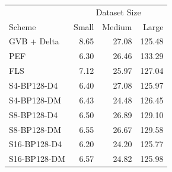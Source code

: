 \begin{tabular}{lrrr}
\toprule
 & \multicolumn{3}{c}{Dataset Size} \\
Scheme & Small & Medium & Large \\
\midrule
GVB + Delta & 8.65 & 27.08 & 125.48 \\
PEF & 6.30 & 26.46 & 133.29 \\
FLS & 7.12 & 25.97 & 127.04 \\
S4-BP128-D4 & 6.40 & 27.08 & 125.97 \\
S4-BP128-DM & 6.43 & 24.48 & 126.45 \\
S8-BP128-D4 & 6.50 & 26.89 & 129.10 \\
S8-BP128-DM & 6.55 & 26.67 & 129.58 \\
S16-BP128-D4 & 6.20 & 24.20 & 125.77 \\
S16-BP128-DM & 6.57 & 24.82 & 125.98 \\
\bottomrule
\end{tabular}
